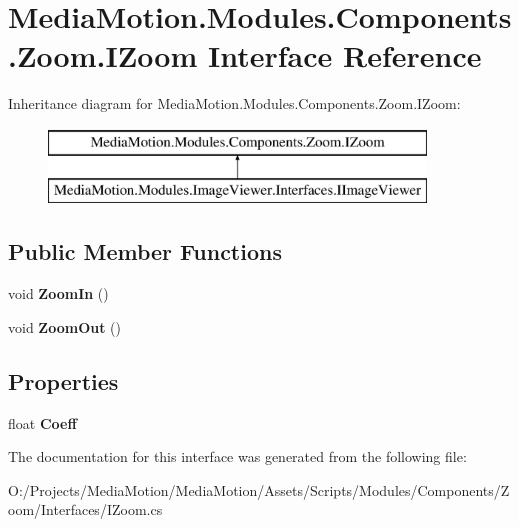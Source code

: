 \hypertarget{interface_media_motion_1_1_modules_1_1_components_1_1_zoom_1_1_i_zoom}{\section{Media\+Motion.\+Modules.\+Components.\+Zoom.\+I\+Zoom Interface Reference}
\label{interface_media_motion_1_1_modules_1_1_components_1_1_zoom_1_1_i_zoom}
}
Inheritance diagram for Media\+Motion.\+Modules.\+Components.\+Zoom.\+I\+Zoom\+:\begin{figure}[H]
\begin{center}
\leavevmode
\includegraphics[height=2.000000cm]{interface_media_motion_1_1_modules_1_1_components_1_1_zoom_1_1_i_zoom}
\end{center}
\end{figure}
\subsection*{Public Member Functions}
\begin{DoxyCompactItemize}
\item 
\hypertarget{interface_media_motion_1_1_modules_1_1_components_1_1_zoom_1_1_i_zoom_ab437e7aac62f2b6a468ccae121405c49}{void {\bfseries Zoom\+In} ()}\label{interface_media_motion_1_1_modules_1_1_components_1_1_zoom_1_1_i_zoom_ab437e7aac62f2b6a468ccae121405c49}

\item 
\hypertarget{interface_media_motion_1_1_modules_1_1_components_1_1_zoom_1_1_i_zoom_a9da4f57dd95348976bf1ad2d3fceaffd}{void {\bfseries Zoom\+Out} ()}\label{interface_media_motion_1_1_modules_1_1_components_1_1_zoom_1_1_i_zoom_a9da4f57dd95348976bf1ad2d3fceaffd}

\end{DoxyCompactItemize}
\subsection*{Properties}
\begin{DoxyCompactItemize}
\item 
\hypertarget{interface_media_motion_1_1_modules_1_1_components_1_1_zoom_1_1_i_zoom_af3224ae49009155024873364ddfee40a}{float {\bfseries Coeff}}\label{interface_media_motion_1_1_modules_1_1_components_1_1_zoom_1_1_i_zoom_af3224ae49009155024873364ddfee40a}

\end{DoxyCompactItemize}


The documentation for this interface was generated from the following file\+:\begin{DoxyCompactItemize}
\item 
O\+:/\+Projects/\+Media\+Motion/\+Media\+Motion/\+Assets/\+Scripts/\+Modules/\+Components/\+Zoom/\+Interfaces/I\+Zoom.\+cs\end{DoxyCompactItemize}
